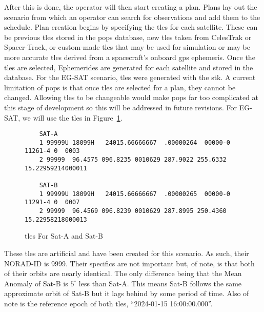 After this is done, the operator will then start creating a plan. Plans lay out
the scenario from which an operator can search for observations and add
them to the schedule. Plan creation begins by specifying the
\glspl{tle} for each satellite.  These can be previous \glspl{tle} stored in
the \gls{pops} database, new \glspl{tle} taken from CelesTrak or Spacer-Track,
or custom-made \glspl{tle} that may be used for simulation or may be more
accurate \glspl{tle} derived from a spacecraft’s onboard \gls{gps} ephemeris.
Once the \glspl{tle} are selected, Ephemerides are generated for each satellite and
stored in the database. For the EG-SAT scenario, \glspl{tle} were generated
with the \gls{stk}. A current limitation of \gls{pops} is that once \glspl{tle}
are selected for a plan, they cannot be changed. Allowing \glspl{tle} to be
changeable would make \gls{pops} far too complicated at this stage of
development so this will be addressed in future revisions. For EG-SAT, we will
use the \glspl{tle} in Figure~\ref{fig:tles}.

\begin{figure}[h]
    \begin{verbatim}
    SAT-A
    1 99999U 18099H   24015.66666667  .00000264  00000-0  11261-4 0  0003
    2 99999  96.4575 096.8235 0010629 287.9022 255.6332 15.22959214000011

    SAT-B
    1 99999U 18099H   24015.66666667  .00000265  00000-0  11291-4 0  0007
    2 99999  96.4569 096.8239 0010629 287.8995 250.4360 15.22958218000013
    \end{verbatim}
    \caption{\glspl{tle} For Sat-A and Sat-B}
    \label{fig:tles}
\end{figure}

These \glspl{tle} are artificial and have been created for this scenario. As
such, their NORAD-ID is 9999. Their specifics are not important but, of note,
is that both of their orbits are nearly identical. The only difference being
that the Mean Anomaly of Sat-B is $5^\circ$ less than Sat-A. This means Sat-B
follows the same approximate orbit of Sat-B but it lags behind by some period
of time. Also of note is the reference epoch of both \glspl{tle}, ``2024-01-15
16:00:00.000''.

